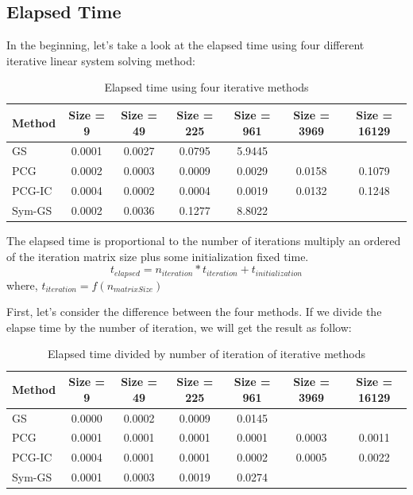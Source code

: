 \documentclass{article}
\begin{document}
\subsection{Elapsed Time}
In the beginning, let's take a look at the elapsed time using four different iterative linear system solving method:
\begin{table}[h]
\begin{center}
\begin{tabular}{lcccccc}
\hline
Method & Size = 9 & Size = 49 & Size = 225 & Size = 961 & Size = 3969 & Size = 16129\\
\hline
GS & 0.0001 & 0.0027 & 0.0795 & 5.9445 & &\\
PCG & 0.0002 & 0.0003 & 0.0009 & 0.0029 & 0.0158 & 0.1079\\
PCG-IC & 0.0004 & 0.0002 & 0.0004 & 0.0019 & 0.0132 & 0.1248\\
Sym-GS & 0.0002 & 0.0036 & 0.1277 & 8.8022 & &\\
\hline
\end{tabular}
\caption{Elapsed time using four iterative methods}
\end{center}
\end{table}


The elapsed time is proportional to the number of iterations multiply an ordered of the iteration matrix size plus some initialization fixed time.
$$t_{elapsed} = n_{iteration} * t_{iteration} + t_{initialization}$$
where, $t_{iteration} = f(n_{matrixSize})$


First, let's consider the difference between the four methods. If we divide the elapse time by the number of iteration, we will get the result as follow:
\begin{table}[h]
\begin{center}
\begin{tabular}{lcccccc}
\hline
Method & Size = 9 & Size = 49 & Size = 225 & Size = 961 & Size = 3969 & Size = 16129\\
\hline
GS & 0.0000 & 0.0002 & 0.0009 & 0.0145 & &\\
PCG & 0.0001 & 0.0001 & 0.0001 & 0.0001 & 0.0003 & 0.0011\\
PCG-IC & 0.0004 & 0.0001 & 0.0001 & 0.0002 & 0.0005 & 0.0022\\
Sym-GS & 0.0001 & 0.0003 & 0.0019 & 0.0274 & &\\
\hline
\end{tabular}
\caption{Elapsed time divided by number of iteration of iterative methods}
\end{center}
\end{table}
\end{document}
